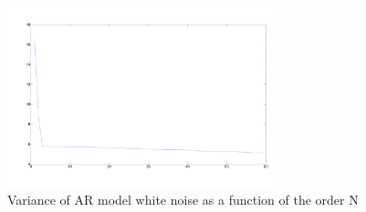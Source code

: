 \documentclass[10pt]{article}
\numberwithin{equation}{section}
\begin{document}
\begin{figure}
  \centering
  \includegraphics[width = 0.7\textwidth]{images/complete_knee.pdf}
  \caption{Variance of AR model white noise as a function of the order N}
  \label{fig:complete_knee}
\end{figure}
\end{document}

